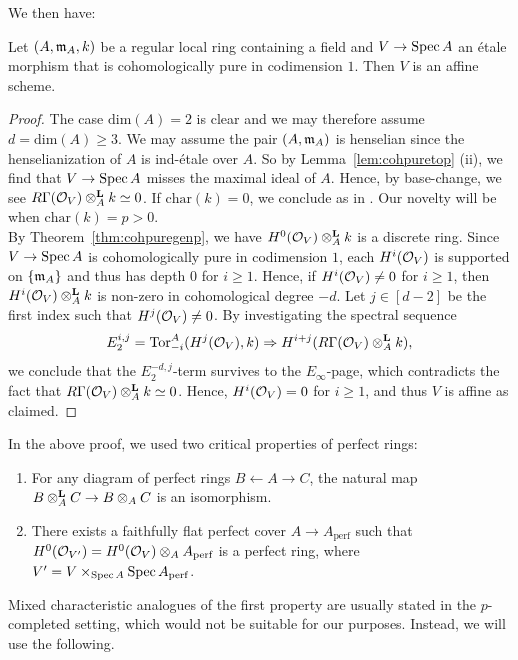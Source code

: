 We then have:
\begin{theorem}\label{thm:cohpuregenequi}
Let $(A,\ideal{m}_A,k)$ be a regular local ring containing a field and $V \to \spec{A}$ an \'{e}tale morphism that is cohomologically pure in codimension $1$. 
Then $V$ is an affine scheme.
\end{theorem}
\begin{proof}
The case $\mathrm{dim}(A) = 2$ is clear and we may therefore assume $d=\mathrm{dim}(A) \ge 3$. 
We may assume the pair $(A, \ideal{m}_A)$ is henselian since the henselianization of $A$ is ind-\'{e}tale over $A$. So by Lemma~\ref{lem:cohpuretop} (ii), we find that $V \to \spec{A}$ misses the maximal ideal of $A$. Hence, by base-change, we see $R\Gamma(\cal{O}_V) \otimesl_A k \simeq 0$.
If $\mathrm{char}(k)=0$, we conclude as in \cite[0ECD]{sp}. Our novelty will be when $\mathrm{char}(k)=p>0$.\\
\indent By Theorem~\ref{thm:cohpuregenp}, we have $H^0(\cal{O}_V) \otimesl_A k$ is a discrete ring. Since $V \to \spec{A}$ is cohomologically pure in codimension $1$, 
each $H^i(\cal{O}_V)$ is supported on $\{\ideal{m}_A\}$ and thus has depth $0$ for $i\ge 1$. 
Hence, if $H^i(\cal{O}_V) \neq 0$ for $i\ge 1$, then $ H^i(\cal{O}_V) \otimesl_A k$ is non-zero in cohomological degree $-d$. Let $j\in [d-2]$ be the first index such that $H^j(\cal{O}_V)\neq 0$. 
By investigating the spectral sequence
\[E_2^{i,j} = \mathrm{Tor}_{-i}^A(H^j(\cal{O}_V), k) \Rightarrow H^{i+j}(R\Gamma(\cal{O}_V) \otimesl_A k),\]
we conclude that the $E_2^{-d,j}$-term survives to the $E_{\infty}$-page, which contradicts the fact that $R\Gamma(\cal{O}_V) \otimesl_A k \simeq 0$. 
Hence, $H^i(\cal{O}_V) = 0$ for $i\ge 1$, and thus $V$ is affine as claimed.
\end{proof}
In the above proof, we used two critical properties of perfect rings:
\begin{enumerate}
\item For any diagram of perfect rings $B \leftarrow A \to C$, the natural map $B \otimesl_A C \to B \otimes_A C$ is an isomorphism.
\item There exists a faithfully flat perfect cover $A \to A_{\text{perf}}$ such that $H^0(\cal{O}_{V'})=H^0(\cal{O}_V) \otimes_A A_{\text{perf}}$ is a perfect ring, where $V' = V \times_{\spec{A}} \spec{A_{\text{perf}}}$.
\end{enumerate}
Mixed characteristic analogues of the first property are usually stated in the $p$-completed setting, which would not be suitable for our purposes.
Instead, we will use the following.
